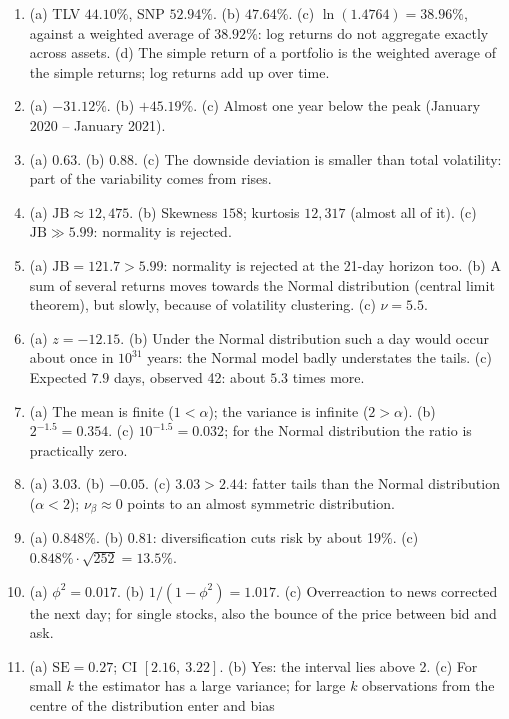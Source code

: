 \documentclass[10.5pt]{article}
\newcommand{\chapterhead}[1]{\par\vspace{1.4ex}{\large\bfseries\color{spfred}#1}\par\vspace{0.4ex}}
\begin{document}
\clearpage
\chapterhead{Answers}
{\small
\begin{enumerate}[label=\textbf{\arabic*.},leftmargin=2.2em,itemsep=0.25ex]
\item (a) TLV $44.10\%$, SNP $52.94\%$. (b) $47.64\%$. (c) $\ln(1.4764)=38.96\%$, against a weighted average of
$38.92\%$: log returns do not aggregate exactly across assets. (d) The simple return of a portfolio is the weighted
average of the simple returns; log returns add up over time.
\item (a) $-31.12\%$. (b) $+45.19\%$. (c) Almost one year below the peak (January 2020 -- January 2021).
\item (a) $0.63$. (b) $0.88$. (c) The downside deviation is smaller than total volatility: part of the variability
comes from rises.
\item (a) $\mathrm{JB}\approx 12{,}475$. (b) Skewness $158$; kurtosis $12{,}317$ (almost all of it).
(c) $\mathrm{JB}\gg 5.99$: normality is rejected.
\item (a) $\mathrm{JB}=121.7>5.99$: normality is rejected at the 21-day horizon too. (b) A sum of several returns
moves towards the Normal distribution (central limit theorem), but slowly, because of volatility clustering.
(c) $\nu=5.5$.
\item (a) $z=-12.15$. (b) Under the Normal distribution such a day would occur about once in $10^{31}$ years: the
Normal model badly understates the tails. (c) Expected $7.9$ days, observed 42: about $5.3$ times more.
\item (a) The mean is finite ($1<\alpha$); the variance is infinite ($2>\alpha$). (b) $2^{-1.5}=0.354$.
(c) $10^{-1.5}=0.032$; for the Normal distribution the ratio is practically zero.
\item (a) $3.03$. (b) $-0.05$. (c) $3.03>2.44$: fatter tails than the Normal distribution ($\alpha<2$);
$\nu_\beta\approx 0$ points to an almost symmetric distribution.
\item (a) $0.848\%$. (b) $0.81$: diversification cuts risk by about 19\%. (c) $0.848\%\cdot\sqrt{252}=13.5\%$.
\item (a) $\phi^2=0.017$. (b) $1/(1-\phi^2)=1.017$. (c) Overreaction to news corrected the next day; for single
stocks, also the bounce of the price between bid and ask.
\item (a) $\mathrm{SE}=0.27$; CI $[2.16,\ 3.22]$. (b) Yes: the interval lies above 2. (c) For small $k$ the
estimator has a large variance; for large $k$ observations from the centre of the distribution enter and bias

\end{enumerate}}
\end{document}

